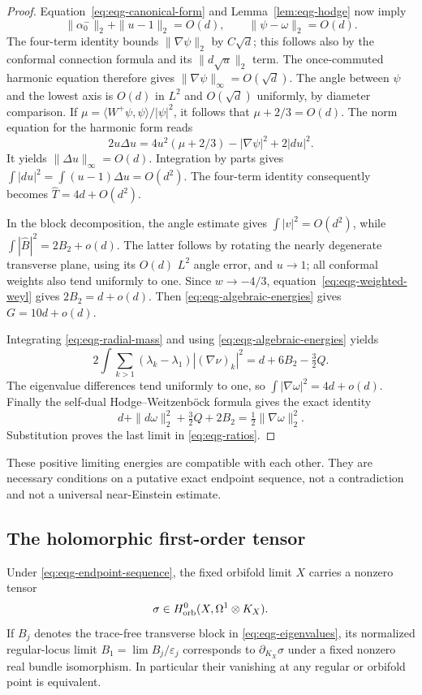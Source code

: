 \begin{proof}
Equation~\eqref{eq:eqg-canonical-form} and
Lemma~\ref{lem:eqg-hodge} now imply
\[
 \|\alpha_0^-\|_2+\|u-1\|_2=O(d),
 \qquad\|\psi-\omega\|_2=O(d).
\]
The four-term identity bounds $\|\nabla\psi\|_2$ by $C\sqrt d$;
this follows also by the conformal connection formula and its
$\|d\sqrt u\|_2$ term.  The once-commuted harmonic equation therefore
gives $\|\nabla\psi\|_\infty=O(\sqrt d)$.
The angle between $\psi$ and the lowest axis is $O(d)$ in $L^2$
and $O(\sqrt d)$ uniformly, by diameter comparison.
If $\mu=\langle W^+\psi,\psi\rangle/|\psi|^2$, it follows that
$\mu+2/3=O(d)$.  The norm equation for the harmonic form reads
\[
 2u\Delta u=4u^2(\mu+2/3)-|\nabla\psi|^2+2|du|^2.
\]
It yields $\|\Delta u\|_\infty=O(d)$.  Integration by parts gives
$\int|du|^2=\int(u-1)\Delta u=O(d^2)$.
The four-term identity consequently becomes
$\widehat T=4d+O(d^2)$.

In the block decomposition, the angle estimate gives
$\int|v|^2=O(d^2)$, while
$\int|\widehat B|^2=2B_2+o(d)$.
The latter follows by rotating the nearly degenerate transverse
plane, using its $O(d)$ $L^2$ angle error, and $u\to1$;
all conformal weights also tend uniformly to one.
Since $w\to-4/3$, equation~\eqref{eq:eqg-weighted-weyl} gives
$2B_2=d+o(d)$.  Then \eqref{eq:eqg-algebraic-energies} gives
$G=10d+o(d)$.

Integrating \eqref{eq:eqg-radial-mass} and using
\eqref{eq:eqg-algebraic-energies} yields
\[
 2\int\sum_{k>1}(\lambda_k-\lambda_1)|(\nabla\nu)_k|^2
 =d+6B_2-\tfrac32Q.
\]
The eigenvalue differences tend uniformly to one, so
$\int|\nabla\omega|^2=4d+o(d)$.
Finally the self-dual Hodge--Weitzenböck formula gives the exact identity
\[
 d+\|d\omega\|_2^2+\tfrac32Q+2B_2
 =\tfrac12\|\nabla\omega\|_2^2.
\]
Substitution proves the last limit in \eqref{eq:eqg-ratios}.
\end{proof}

These positive limiting energies are compatible with each other.
They are necessary conditions on a putative exact endpoint sequence,
not a contradiction and not a universal near-Einstein estimate.

\subsection{The holomorphic first-order tensor}

\begin{proposition}\label{prop:eqg-holomorphic}
Under \eqref{eq:eqg-endpoint-sequence}, the fixed orbifold limit $X$
carries a nonzero tensor
\[
 \sigma\in H^0_{\rm orb}(X,\Omega^1\otimes K_X).
\]
If $B_j$ denotes the trace-free transverse block in
\eqref{eq:eqg-eigenvalues}, its normalized regular-locus limit
$B_1=\lim B_j/\varepsilon_j$ corresponds to $\partial_{K_X}\sigma$
under a fixed nonzero real bundle isomorphism.  In particular their
vanishing at any regular or orbifold point is equivalent.
\end{proposition}

